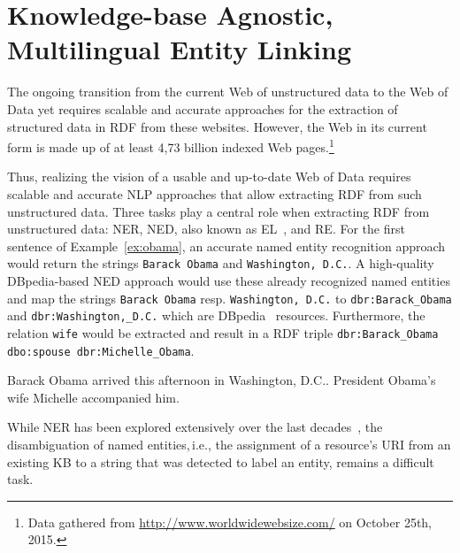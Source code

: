 
\chapter{Knowledge-base Agnostic, Multilingual Entity Linking}

The ongoing transition from the current Web of unstructured data to the Web of Data yet requires scalable and accurate approaches for the extraction of structured data in \ac{RDF} from these websites.
However, the Web in its current form is made up of at least 4,73  billion indexed Web pages.\footnote{Data gathered from \url{http://www.worldwidewebsize.com/} on October 25th, 2015.}


Thus, realizing the vision of a usable and up-to-date Web of Data requires scalable and accurate \ac{NLP} approaches that allow extracting \ac{RDF} from such unstructured data.
Three tasks play a central role when extracting \ac{RDF} from unstructured data:  \ac{NER}, \ac{NED}, also known as \ac{EL}~\cite{Mihalcea:2007:WLD:1321440.1321475}, and \ac{RE}.
For the first sentence of Example~\ref{ex:obama}, an accurate named entity recognition approach would return the strings \texttt{Barack Obama} and \texttt{Washington, D.C.}.
A high-quality DBpedia-based \ac{NED} approach would use these already recognized named entities and map the strings \texttt{Barack Obama} resp. \texttt{Washington, D.C.} to \texttt{dbr:Barack\_Obama} and \texttt{dbr:Washington,\_D.C.} which are DBpedia~\cite{dbpedia-swj} resources. 
Furthermore, the relation \texttt{wife} would be extracted and result in a RDF triple \texttt{dbr:Barack\_Obama dbo:spouse dbr:Michelle\_Obama}.
\begin{ex}
Barack Obama arrived this afternoon in Washington, D.C.. President Obama's wife Michelle accompanied him.
\label{ex:obama}
\end{ex}
While \ac{NER} has been explored extensively over the last decades~\cite{StanfordNER}, the disambiguation of named entities,\,i.e., the assignment of a resource's URI from an existing \ac{KB} to a string that was detected to label an entity, remains a difficult task.

